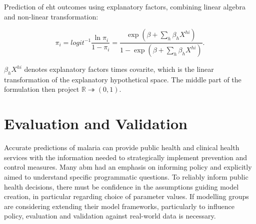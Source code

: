 \documentclass[a4paper, 12pt, twoside]{article}
\begin{document}
Prediction of \gls{eht} outcomes using explanatory factors, combining linear algebra and non-linear transformation\cite{Sherrard-Smith2018b}:

\[
	\pi_i = logit^{-1} \frac{\ln \pi_i}{1-\pi_i} = \frac{ \exp( \beta + \sum_h \beta_h X^{hi} ) }{ 1 - \exp( \beta + \sum_h \beta_h X^{hi} ) }
	.\]

$\beta_h X^{hi}$ denotes explanatory factors times covarite, which is the linear transformation of the explanatory hypothetical space. The middle part of the formulation then project $\mathbb{R} \twoheadrightarrow (0,1)$.

\section{Evaluation and Validation}
Accurate predictions of malaria can provide public health and clinical health services with the information needed to strategically implement prevention and control measures.
Many \gls{abm} had an emphasis on informing policy and explicitly aimed to understand specific programmatic questions.
To reliably inform public health decisions, there must be confidence in the assumptions guiding model creation, in particular regarding choice of parameter values.
If modelling groups are considering extending their model frameworks, particularly to influence policy, evaluation and validation against real-world data is necessary.
\end{document}
